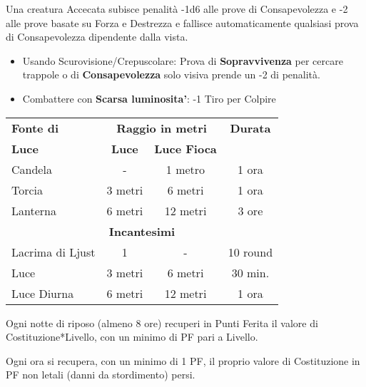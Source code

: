 \documentclass[landscape,10pt,a4paper]{article}
\begin{document}
\begin{multicols}{3}
\begin{dmbox}[title=Visione - pagina \pageref{visioneeluce}]

Una creatura Accecata subisce penalità -1d6 alle prove di Consapevolezza e -2 alle prove basate su Forza e Destrezza e fallisce automaticamente qualsiasi prova di Consapevolezza dipendente dalla vista.

\begin{itemize}[leftmargin=0.5cm,itemsep=-1pt,parsep=0pt]
\item Usando Scurovisione/Crepuscolare: Prova di \textbf{Sopravvivenza} per cercare trappole o di \textbf{Consapevolezza} solo visiva prende un -2 di penalità.
\item Combattere con \textbf{Scarsa luminosita'}: -1 Tiro per Colpire
\end{itemize}
\end{dmbox}

\begin{dmbox}[title=Fonti di Luce - pagina \pageref{fontidiluce}]

\noindent\begin{tabular}{l|cc|c}
\textbf{Fonte di} &\multicolumn{2}{c}{\textbf{Raggio in metri}}& \textbf{Durata}  \\
\textbf{Luce}& \textbf{Luce} & \textbf{Luce Fioca} &\\
Candela & - & 1 metro & 1 ora\\
Torcia & 3 metri & 6 metri & 1 ora\\
Lanterna & 6 metri & 12 metri & 3 ore \\
\multicolumn{4}{c}{\textbf{Incantesimi}}\\
Lacrima di Ljust & 1 & - & 10 round\\
Luce  & 3 metri & 6 metri &30 min. \\
Luce Diurna & 6 metri & 12 metri & 1 ora 
\end{tabular}
\end{dmbox}

\begin{dmbox}[title=Riposare 8 ore - pagina \pageref{recuperarepf}]
Ogni notte di riposo (almeno 8 ore) recuperi in Punti Ferita il valore di Costituzione*Livello, con un minimo di PF pari a Livello. 
\end{dmbox}


\begin{dmbox}[title=Danni non letali - pagina \pageref{recuperopuntiferitanonletali}]
Ogni ora si recupera, con un minimo di 1 PF, il proprio valore di Costituzione in PF non letali (danni da stordimento) persi.
\end{dmbox}




\end{multicols}
\end{document}
